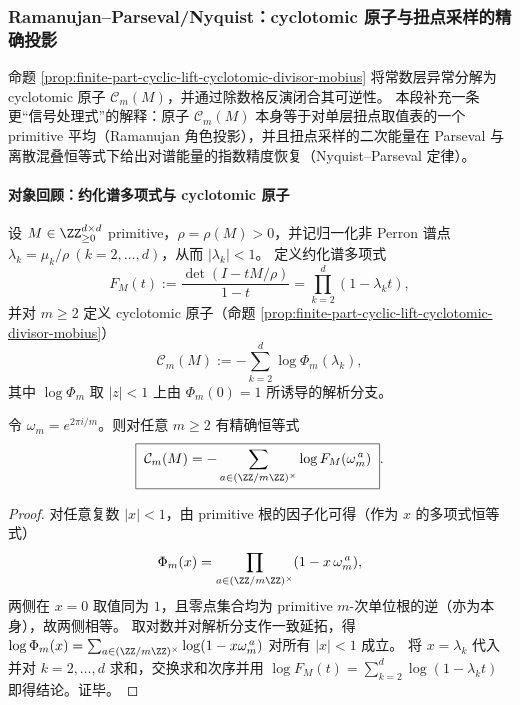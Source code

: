 
\subsubsection{Ramanujan--Parseval/Nyquist：cyclotomic 原子与扭点采样的精确投影}\label{subsubsec:finite-part-ramanujan-parseval-nyquist}
命题 \ref{prop:finite-part-cyclic-lift-cyclotomic-divisor-mobius} 将常数层异常分解为 cyclotomic 原子 \(\mathcal{C}_m(M)\)，并通过除数格反演闭合其可逆性。
本段补充一条更“信号处理式”的解释：原子 \(\mathcal{C}_m(M)\) 本身等于对单层扭点取值表的一个 primitive 平均（Ramanujan 角色投影），并且扭点采样的二次能量在 Parseval 与离散混叠恒等式下给出对谱能量的指数精度恢复（Nyquist--Parseval 定律）。

\paragraph{对象回顾：约化谱多项式与 cyclotomic 原子}
设 \(M\in\ZZ_{\ge0}^{d\times d}\) primitive，\(\rho=\rho(M)>0\)，并记归一化非 Perron 谱点 \(\lambda_k=\mu_k/\rho\ (k=2,\dots,d)\)，从而 \(|\lambda_k|<1\)。
定义约化谱多项式
\[
F_M(t):=\frac{\det(I-tM/\rho)}{1-t}=\prod_{k=2}^{d}(1-\lambda_k t),
\]
并对 \(m\ge 2\) 定义 cyclotomic 原子（命题 \ref{prop:finite-part-cyclic-lift-cyclotomic-divisor-mobius}）
\[
\mathcal{C}_m(M):=-\sum_{k=2}^{d}\log \Phi_m(\lambda_k),
\]
其中 \(\log\Phi_m\) 取 \(|z|<1\) 上由 \(\Phi_m(0)=1\) 所诱导的解析分支。

\begin{theorem}\label{thm:finite-part-cyclotomic-atom-primitive-torsion-average}
令 \(\omega_m=e^{2\pi i/m}\)。则对任意 \(m\ge 2\) 有精确恒等式
\[
\boxed{\;
\mathcal{C}_m(M)=-\sum_{a\in(\ZZ/m\ZZ)^\times}\log F_M(\omega_m^{\,a})\; }.
\]
\end{theorem}
\begin{proof}
对任意复数 \(|x|<1\)，由 primitive 根的因子化可得（作为 \(x\) 的多项式恒等式）
\[
\Phi_m(x)=\prod_{a\in(\ZZ/m\ZZ)^\times}(1-x\,\omega_m^{\,a}),
\]
两侧在 \(x=0\) 取值同为 \(1\)，且零点集合均为 primitive \(m\)-次单位根的逆（亦为本身），故两侧相等。
取对数并对解析分支作一致延拓，得
\(
\log\Phi_m(x)=\sum_{a\in(\ZZ/m\ZZ)^\times}\log(1-x\omega_m^{\,a})
\)
对所有 \(|x|<1\) 成立。
将 \(x=\lambda_k\) 代入并对 \(k=2,\dots,d\) 求和，交换求和次序并用
\(
\log F_M(t)=\sum_{k=2}^{d}\log(1-\lambda_k t)
\)
即得结论。证毕。
\end{proof}

